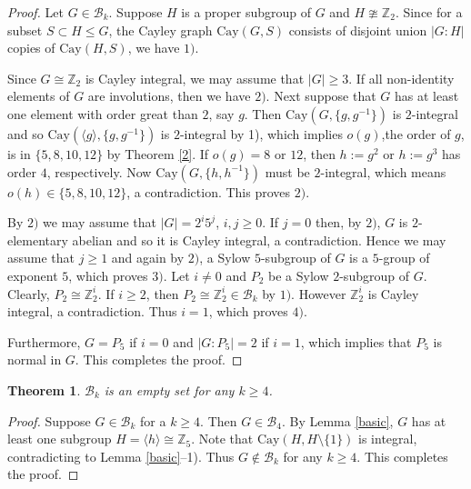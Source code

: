 \documentclass[12pt,a4paper]{article}
\newtheorem{thm}{Theorem}[section]
\def \leq {\leqslant}
\def \geq {\geqslant}
\begin{document}
	\begin{proof}
		Let $G\in\mathcal{B}_k$.
		Suppose $H$ is a proper subgroup of $G$ and $H\ncong \mathbb{Z}_2$.
		Since for a subset $S\subset H\leq G$, the Cayley graph $\mathrm{Cay}(G,S)$ consists of disjoint union  $|G:H|$ copies of $\mathrm{Cay}(H,S)$, we have $1)$. 
		
		Since $G\cong \mathbb{Z}_2$ is Cayley integral, we may assume that $|G|\geq 3$.
		If all non-identity elements of $G$ are involutions, then we have $2)$.
		Next suppose that $G$ has at least one element with order great than $2$, say $g$.
		Then $\mathrm{Cay}(G,\{g,g^{-1}\})$ is $2$-integral and so $\mathrm{Cay}(\langle g\rangle,\{g,g^{-1}\})$ is $2$-integral by 1), which implies $o(g)$,the order of $g$, is in $\{5,8,10,12\}$ by Theorem \ref{2}. If $o(g)=8$ or $12$, then $h:=g^{2}$ or $h:=g^3$ has order $4$, respectively. Now $\mathrm{Cay}(G,\{h,h^{-1}\})$ must be $2$-integral, which means $o(h)\in\{5,8,10,12\}$, a contradiction. This proves $2)$.
		
		
		By $2)$ we may assume that $|G|=2^i5^j$,  $i,j\geq 0$. If $j=0$ then, by $2)$, $G$ is $2$-elementary abelian and so it is Cayley integral, a contradiction. Hence we may assume that $j\geq 1$ and again by $2)$, a Sylow $5$-subgroup of $G$ is a $5$-group of exponent $5$, which proves $3)$. Let $i\neq 0$ and  $P_2$ be a Sylow $2$-subgroup  of $G$. Clearly, $P_2\cong \mathbb{Z}_2^i$.
		If $i\geq 2$, then $P_2\cong \mathbb{Z}_2^i\in \mathcal{B}_k$ by $1)$.
		However $\mathbb{Z}_2^i$ is Cayley integral, a contradiction.
		Thus $i=1$, which proves $4)$.
		
		Furthermore, $G=P_5$ if $i=0$ and $|G:P_5|=2$ if $i=1$, which implies that $P_5$ is normal in $G$.
		This completes the proof.
	\end{proof}
	
	\begin{thm}\label{thm:B4 empty}
		$\mathcal{B}_k$ is an empty set for any $k\geq 4$. 
	\end{thm}
	\begin{proof}
		Suppose $G\in \mathcal{B}_k$ for a $k\geq 4$.
		Then $G\in \mathcal{B}_4$.
		By Lemma \ref{basic}, $G$ has at least one subgroup $H=\langle h\rangle \cong \mathbb{Z}_5$. 
		Note that $\mathrm{Cay}(H,H\setminus \{1\})$ is integral, contradicting to Lemma \ref{basic}--1).
		Thus $G\notin \mathcal{B}_k$ for any $k\geq 4$.
		This completes the proof.
	\end{proof}
	
\end{document}
